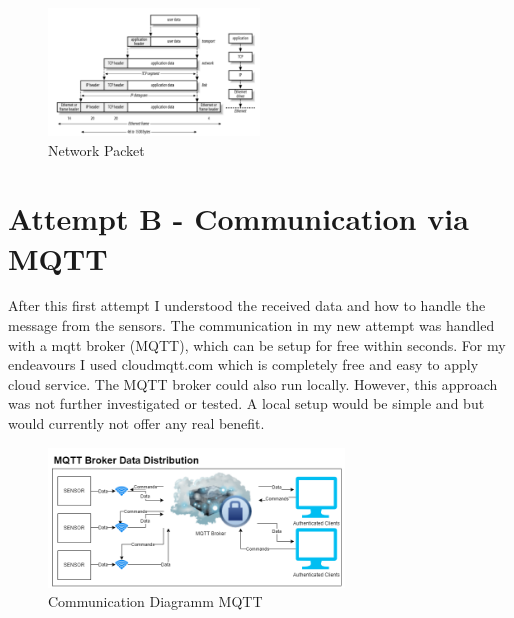 \begin{figure}[h]
  \begin{center}
\includegraphics[width=0.5\textwidth]{images/Screenshot_5.png}
  \end{center}
  \caption{Network Packet \cite{22Dissec90:online}}
  \label{fig:Networkpacket}
\end{figure}



\section{Attempt B - Communication via MQTT}

After this first attempt I understood the received data and how to handle the message from the sensors.
The communication in my new attempt was handled with a \acrshort{mqtt} broker (\gls{MQTT}), which can be setup for free within seconds. For my endeavours I used cloudmqtt.com which is completely free and easy to apply cloud service.  The MQTT broker could also run locally. However, this approach was not further investigated or tested. A local setup would be simple and but would currently not offer any real benefit.


\begin{figure}[ht]
  \begin{center}
\includegraphics[width=0.7\textwidth]{images/CommunicationDiagrammMQTT.png}
  \end{center}
  \caption{Communication Diagramm MQTT}
  \label{fig:CommunicationDiagrammMQTT}
\end{figure}

